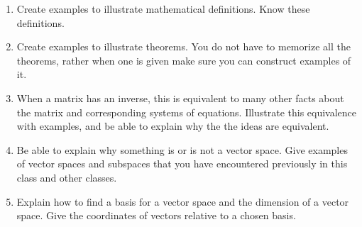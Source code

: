 
\begin{enumerate}

\item Create examples to illustrate mathematical definitions. Know these definitions.
\item Create examples to illustrate theorems. You do not have to memorize all the theorems, rather when one is given make sure you can construct examples of it. 
\item When a matrix has an inverse, this is equivalent to many other facts about the matrix and corresponding systems of equations.  Illustrate this equivalence with examples, and be able to explain why the the ideas are equivalent.
\item Be able to explain why something is or is not a vector space. Give examples of vector spaces and subspaces that you have encountered previously in this class and other classes.
\item Explain how to find a basis for a vector space and the dimension of a vector space. Give the coordinates of vectors relative to a chosen basis.

\end{enumerate}
